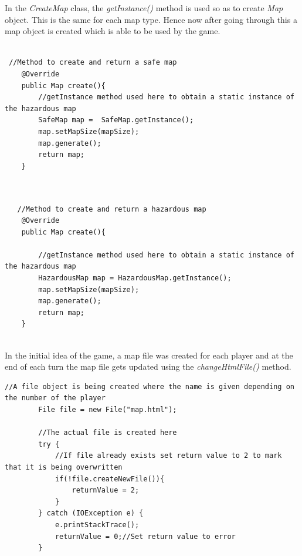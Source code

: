 \documentclass[a4paper,12pt]{extarticle}
\begin{document}
In the \textit{CreateMap} class, the \textit{getInstance()} method is used so as to create \textit{Map} object. This is the same for each map type. Hence now after going through this a map object is created which is able to be used by the game.\\

\begin{lstlisting}

 //Method to create and return a safe map
    @Override
    public Map create(){
        //getInstance method used here to obtain a static instance of the hazardous map
        SafeMap map =  SafeMap.getInstance();
        map.setMapSize(mapSize);
        map.generate();
        return map;
    }


\end{lstlisting}
\vspace{4mm}



\begin{lstlisting}

   //Method to create and return a hazardous map
    @Override
    public Map create(){

        //getInstance method used here to obtain a static instance of the hazardous map
        HazardousMap map = HazardousMap.getInstance();
        map.setMapSize(mapSize);
        map.generate();
        return map;
    }


\end{lstlisting}
\vspace{4mm}

In the initial idea of the game, a map file was created for each player and at the end of each turn the map file gets updated using the \textit{changeHtmlFile()} method.\\

\begin{lstlisting}
//A file object is being created where the name is given depending on the number of the player
        File file = new File("map.html");

        //The actual file is created here
        try {
            //If file already exists set return value to 2 to mark that it is being overwritten
            if(!file.createNewFile()){
                returnValue = 2;
            }
        } catch (IOException e) {
            e.printStackTrace();
            returnValue = 0;//Set return value to error
        }
\end{lstlisting}
\vspace{4mm}
\end{document}
